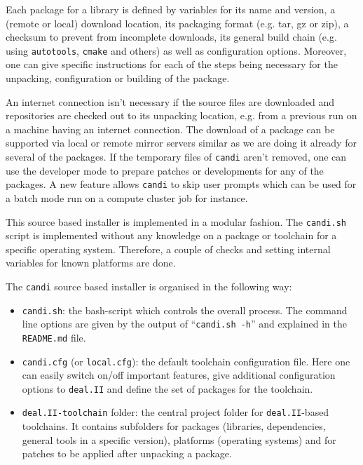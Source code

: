 \documentclass{ansarticle-preprint}
\newcommand{\specialword}[1]{\texttt{#1}}
\newcommand{\dealii}{{\specialword{deal.II}}\xspace}
\newcommand{\candi}{{\specialword{candi}}\xspace}
\begin{document}
Each package for a library is defined by variables for its name and version,
a (remote or local) download location,
its packaging format (e.g. tar, gz or zip),
a checksum to prevent from incomplete downloads,
its general build chain (e.g. using \texttt{autotools}, \texttt{cmake} and others)
as well as configuration options.
%
Moreover, one can give specific instructions for each of the steps being
necessary for the unpacking, configuration or building of the package.

An internet connection isn't necessary
if the source files are downloaded and
repositories are checked out to its unpacking location,
e.g. from a previous run on a machine having an internet connection.
%
The download of a package can be supported via local or remote mirror servers
similar as we are doing it already for several of the packages.
%
If the temporary files of \candi{} aren't removed, one can use the developer
mode to prepare patches or developments for any of the packages.
%
A new feature allows \candi{} to skip user prompts which can be used for
a batch mode run on a compute cluster job for instance.

This source based installer is implemented in a modular fashion.
The \texttt{candi.sh} script is implemented without any knowledge
on a package or toolchain for a specific operating system.
Therefore, a couple of checks and setting internal variables
for known platforms are done.

The \candi{} source based installer is organised in the following way:
\begin{itemize}
\item \texttt{candi.sh}: the bash-script which controls the overall process.
The command line options are given by the output of ``\texttt{candi.sh -h}''
and explained in the \texttt{README.md} file.

\item \texttt{candi.cfg} (or \texttt{local.cfg}): the default toolchain
configuration file. Here one can easily switch on/off important features,
give additional configuration options to \dealii{} and
define the set of packages for the toolchain.

\item \texttt{deal.II-toolchain} folder: the central project folder for
\dealii{}-based toolchains.
It contains subfolders
for packages (libraries, dependencies, general tools in a specific version),
platforms (operating systems) and
for patches to be applied after unpacking a package.

\end{itemize}
\end{document}
